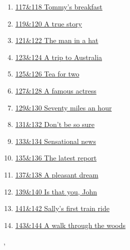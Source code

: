 \documentclass[11pt]{article}
\renewcommand{\today}{\shortmonthname[\the\month] \the \day,  \the\year}
\begin{document}
\begin{multicols}{2}
\begin{enumerate}
		\item \href{https://mp.weixin.qq.com/s/qzNF0ZFCnap4xzWCNd-HFw}{117\&118 Tommy's breakfast }	%
		\item \href{https://mp.weixin.qq.com/s/ZvdPBlDz73T68TvhlBcX6Q}{119\&120 A true story}	%
		\item \href{https://mp.weixin.qq.com/s/pl6LAyLmIiJZnUQpI8FrOw}{121\&122 The man in a hat }	%
		\item \href{https://mp.weixin.qq.com/s/mkLKXTuaUnU_1tyQqs09zA}{123\&124 A trip to Australia}	%
		\item \href{https://mp.weixin.qq.com/s/7kgCTMSANjHJY-kwm_R5Hw}{125\&126 Tea for two}	%
		\item \href{https://mp.weixin.qq.com/s/bclWUB4Xji7ZdhAs-5HWBA}{127\&128 A famous actress}	%
		\item \href{https://mp.weixin.qq.com/s/Ga5_bmWUOZZD9ZRV0AM12A}{129\&130 Seventy miles an hour}	%
		\item \href{https://mp.weixin.qq.com/s/1XdxRQo7DZsK8znQ0f2fdA}{131\&132 Don't be so sure}	%
		\item \href{https://mp.weixin.qq.com/s/p6Gq-RR2cT7myzw0vdU7lA}{133\&134 Sensational news}	%
		\item \href{https://mp.weixin.qq.com/s/U0mvHsK5glAzsvRl-9vBLQ}{135\&136 The latest report}	%
		\item \href{https://mp.weixin.qq.com/s/zPezzDBQLdi8c1d0MQcSgA}{137\&138 A pleasant dream}	%
		\item \href{https://mp.weixin.qq.com/s/ndysQezAwqJcl2Q3czRZnQ}{139\&140 Is that you, John}	%
		\item \href{https://mp.weixin.qq.com/s/gN3BuC-KROaDGL_d3CRDBw}{141\&142 Sally's first train ride}	%
		\item \href{https://mp.weixin.qq.com/s/ZAztF0Rd8LTlFfDWn6TJDg}{143\&144 A walk through the woods}	%
	\end{enumerate}
\end{multicols}



%
\begin{flushright}
	\tiny \today 
\end{flushright}
\end{document}
